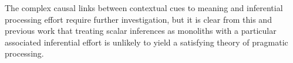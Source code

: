 \documentclass[10pt,letterpaper]{article}
\begin{document}
The complex causal links between contextual cues to meaning and inferential processing effort require further investigation, but it is clear from this and previous work that treating scalar inferences as monoliths with a particular associated inferential effort is unlikely to yield a satisfying theory of pragmatic processing.





%
%




\setlength{\bibleftmargin}{.125in}
\setlength{\bibindent}{-\bibleftmargin}


\end{document}
